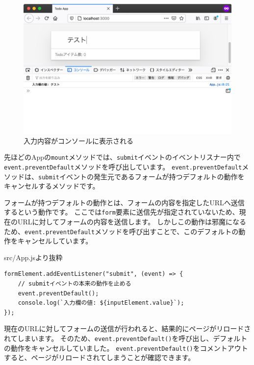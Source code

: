\begin{figure}[h]
\centering
\includegraphics[width=130mm]{./fig/prevent-event.pdf}
\caption{入力内容がコンソールに表示される}
\end{figure}

先ほどのAppの\texttt{mount}メソッドでは、\texttt{submit}イベントのイベントリスナー内で\texttt{event.prevent\linebreak Default}メソッドを呼び出しています。
\texttt{event.preventDefault}メソッドは、\texttt{submit}イベントの発生元であるフォームが持つデフォルトの動作をキャンセルするメソッドです。

フォームが持つデフォルトの動作とは、フォームの内容を指定したURLへ送信するという動作です。
ここでは\texttt{form}要素に送信先が指定されていないため、現在のURLに対してフォームの内容を送信します。
しかしこの動作は邪魔になるため、\texttt{event.preventDefault}メソッドを呼び出すことで、このデフォルトの動作をキャンセルしています。

\begin{listtitle}
src/App.jsより抜粋
\end{listtitle}
\begin{lstlisting}
formElement.addEventListener("submit", (event) => {
    // submitイベントの本来の動作を止める
    event.preventDefault();
    console.log(`入力欄の値: ${inputElement.value}`);
});
\end{lstlisting}
\listend

現在のURLに対してフォームの送信が行われると、結果的にページがリロードされてしまいます。
そのため、\texttt{event.preventDefault()}を呼び出し、デフォルトの動作をキャンセルしていました。
\texttt{event.preventDefault()}をコメントアウトすると、ページがリロードされてしまうことが確認できます。

